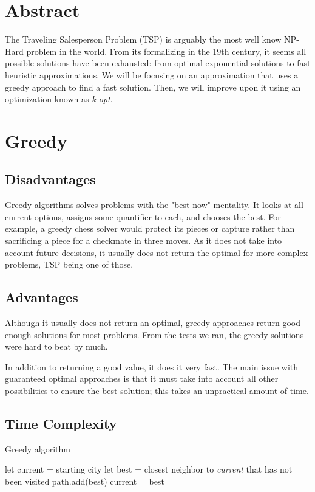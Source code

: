 \documentclass[12pt]{report}
\begin{document}
\begin{multicols}{2}

    \section{Abstract}
    The Traveling Salesperson Problem (TSP) is arguably the most well know NP-Hard problem in the world. From its formalizing in the 19th century, it seems all possible solutions have been exhausted: from optimal exponential solutions to fast heuristic approximations. We will be focusing on an approximation that uses a greedy approach to find a fast solution. Then, we will improve upon it using an optimization known as \textit{k-opt}.

    \section{Greedy}
    \subsection{Disadvantages}
    Greedy algorithms solves problems with the "best now" mentality. It looks at all current options, assigns some quantifier to each, and chooses the best. For example, a greedy chess solver would protect its pieces or capture rather than sacrificing a piece for a checkmate in three moves. As it does not take into account future decisions, it usually does not return the optimal for more complex problems, TSP being one of those.
    \subsection{Advantages}
    Although it usually does not return an optimal, greedy approaches return good enough solutions for most problems. From the tests we ran, the greedy solutions were hard to beat by much.

    In addition to returning a good value, it does it very fast. The main issue with guaranteed optimal approaches is that it must take into account all other possibilities to ensure the best solution; this takes an unpractical amount of time.
\end{multicols}

\subsection{Time Complexity}
\begin{algorithm}
\caption{Greedy algorithm}
\label{Greedy_Alg}
\begin{algorithmic}[1]
    \State let current = starting city
    \State let best = closest neighbor to \textit{current} that has not been visited
    \State path.add(best)
    \State current = best
    \EndWhile
\EndProcedure
\end{algorithmic}
\end{algorithm}
\end{document}

